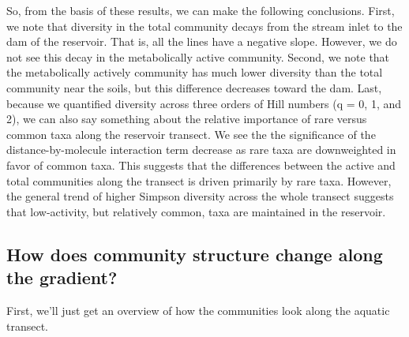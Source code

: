 \documentclass[]{article}
\begin{document}
So, from the basis of these results, we can make the following
conclusions. First, we note that diversity in the total community decays
from the stream inlet to the dam of the reservoir. That is, all the
lines have a negative slope. However, we do not see this decay in the
metabolically active community. Second, we note that the metabolically
actively community has much lower diversity than the total community
near the soils, but this difference decreases toward the dam. Last,
because we quantified diversity across three orders of Hill numbers (q =
0, 1, and 2), we can also say something about the relative importance of
rare versus common taxa along the reservoir transect. We see the the
significance of the distance-by-molecule interaction term decrease as
rare taxa are downweighted in favor of common taxa. This suggests that
the differences between the active and total communities along the
transect is driven primarily by rare taxa. However, the general trend of
higher Simpson diversity across the whole transect suggests that
low-activity, but relatively common, taxa are maintained in the
reservoir.

\subsection{How does community structure change along the
gradient?}\label{how-does-community-structure-change-along-the-gradient}

First, we'll just get an overview of how the communities look along the
aquatic transect.
\end{document}
